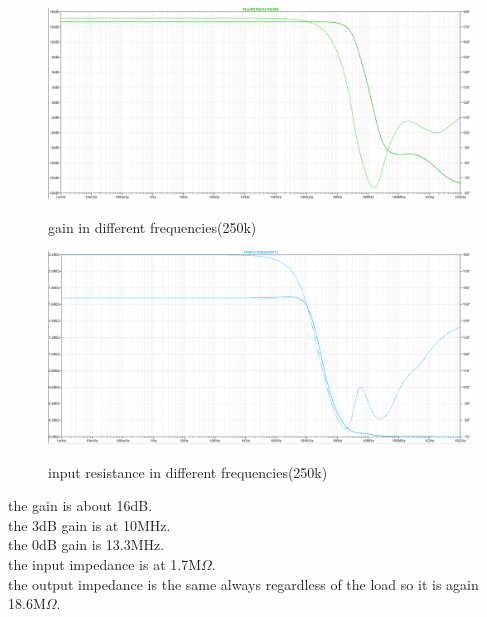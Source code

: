\documentclass[11pt]{article}
\begin{document}
\begin{figure}[H]
    \begin{center}
        \includegraphics[scale=0.45]{Fig/ac-gain250.png}
        \label{fig:ACgain250}
        \caption{gain in different frequencies(250k)}
    \end{center}
\end{figure}
\begin{figure}[H]
    \begin{center}
        \includegraphics[scale=0.45]{Fig/ac-in-resistance250.png}
        \label{fig:ACinResistance250}
        \caption{input resistance in different frequencies(250k)}
    \end{center}
\end{figure}
the gain is about 16dB. \\
the 3dB gain is at 10MHz. \\
the 0dB gain is 13.3MHz. \\
the input impedance is at 1.7M$\Omega$. \\
the output impedance is the same always regardless of the load so it is again 18.6M$\Omega$.
\end{document}

